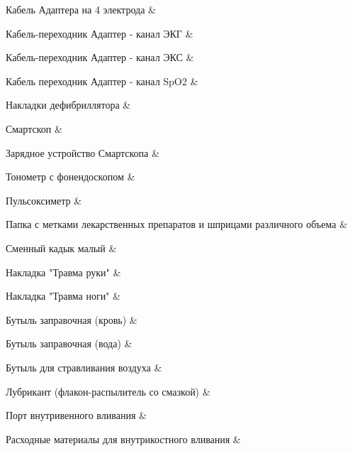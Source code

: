 {        Кабель Адаптера на 4 электрода & \\ \hline
        
        Кабель-переходник Адаптер - канал ЭКГ & \\ \hline
        
        Кабель-переходник Адаптер - канал ЭКС & \\ \hline
        
        Кабель переходник Адаптер - канал SpO2 & \\ \hline
        
        Накладки дефибриллятора & \\ \hline
        
        Смартскоп & \\ \hline
        
        Зарядное устройство Смартскопа & \\ \hline
        
        Тонометр с фонендоскопом & \\ \hline
        
        Пульсоксиметр & \\ \hline
        
        Папка с метками лекарственных препаратов и шприцами различного объема & \\ \hline
        
        Сменный кадык малый & \\ \hline
        
        Накладка "Травма руки" & \\ \hline
        
        Накладка "Травма ноги" & \\ \hline
        
        Бутыль заправочная (кровь) & \\ \hline
        
        Бутыль заправочная (вода) & \\ \hline
        
        Бутыль для стравливания воздуха & \\ \hline
        
        Лубрикант (флакон-распылитель со смазкой) & \\ \hline
        
        Порт внутривенного вливания & \\ \hline
        
        Расходные материалы для внутрикостного вливания & \\ \hline
        
}
